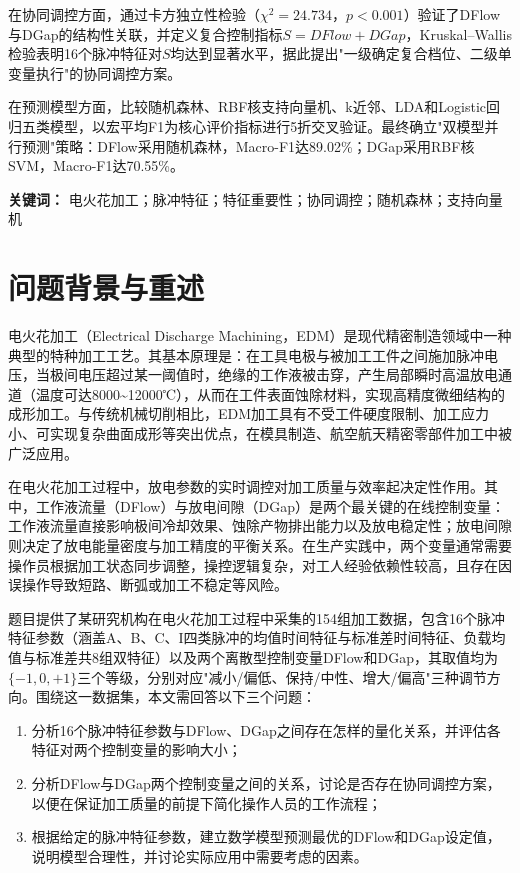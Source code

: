 \documentclass[UTF8,a4paper,12pt]{ctexart}
\begin{document}
在协同调控方面，通过卡方独立性检验（$\chi^2=24.734$，$p<0.001$）验证了DFlow与DGap的结构性关联，并定义复合控制指标$S=DFlow+DGap$，Kruskal--Wallis检验表明16个脉冲特征对$S$均达到显著水平，据此提出"一级确定复合档位、二级单变量执行"的协同调控方案。

在预测模型方面，比较随机森林、RBF核支持向量机、k近邻、LDA和Logistic回归五类模型，以宏平均F1为核心评价指标进行5折交叉验证。最终确立"双模型并行预测"策略：DFlow采用随机森林，Macro-F1达89.02\%；DGap采用RBF核SVM，Macro-F1达70.55\%。

\vspace{0.8em}
\noindent\textbf{关键词：} 电火花加工；脉冲特征；特征重要性；协同调控；随机森林；支持向量机

\clearpage

\section{问题背景与重述}

电火花加工（Electrical Discharge Machining，EDM）是现代精密制造领域中一种典型的特种加工工艺。其基本原理是：在工具电极与被加工工件之间施加脉冲电压，当极间电压超过某一阈值时，绝缘的工作液被击穿，产生局部瞬时高温放电通道（温度可达8000\textasciitilde12000℃），从而在工件表面蚀除材料，实现高精度微细结构的成形加工。与传统机械切削相比，EDM加工具有不受工件硬度限制、加工应力小、可实现复杂曲面成形等突出优点，在模具制造、航空航天精密零部件加工中被广泛应用。

在电火花加工过程中，放电参数的实时调控对加工质量与效率起决定性作用。其中，工作液流量（DFlow）与放电间隙（DGap）是两个最关键的在线控制变量：工作液流量直接影响极间冷却效果、蚀除产物排出能力以及放电稳定性；放电间隙则决定了放电能量密度与加工精度的平衡关系。在生产实践中，两个变量通常需要操作员根据加工状态同步调整，操控逻辑复杂，对工人经验依赖性较高，且存在因误操作导致短路、断弧或加工不稳定等风险。

题目提供了某研究机构在电火花加工过程中采集的154组加工数据，包含16个脉冲特征参数（涵盖A、B、C、I四类脉冲的均值时间特征与标准差时间特征、负载均值与标准差共8组双特征）以及两个离散型控制变量DFlow和DGap，其取值均为$\{-1,0,+1\}$三个等级，分别对应"减小/偏低、保持/中性、增大/偏高"三种调节方向。围绕这一数据集，本文需回答以下三个问题：

\begin{enumerate}[label=(\arabic*),leftmargin=2em]
\item 分析16个脉冲特征参数与DFlow、DGap之间存在怎样的量化关系，并评估各特征对两个控制变量的影响大小；
\item 分析DFlow与DGap两个控制变量之间的关系，讨论是否存在协同调控方案，以便在保证加工质量的前提下简化操作人员的工作流程；
\item 根据给定的脉冲特征参数，建立数学模型预测最优的DFlow和DGap设定值，说明模型合理性，并讨论实际应用中需要考虑的因素。
\end{enumerate}
\end{document}
